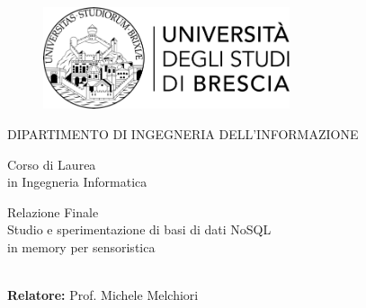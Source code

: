 \begin{titlepage}
    \begin{center}

        \begin{figure}[t]
            \centering
            \includegraphics[width=72.4mm,height=30mm]{img/logo_unibs}
        \end{figure}

        \vspace*{10mm}

        {\fontsize{17}{17}\selectfont
        DIPARTIMENTO DI INGEGNERIA DELL'INFORMAZIONE\\
        }

        \vspace*{10mm}

        {\fontsize{17}{17}\selectfont
        Corso di Laurea\\
        in Ingegneria Informatica\\

        }

        \vspace*{20mm}

        {\fontsize{20}{20}\selectfont
        Relazione Finale\\
        Studio e sperimentazione di basi di dati NoSQL\\
        in memory per sensoristica\\
        \\
        }

    \end{center}

    \vfill

    \begin{flushleft}
    {\fontsize{17}{17}\selectfont
    \textbf{Relatore:} Prof. Michele Melchiori
    }

    \end{flushleft}


\end{titlepage}
